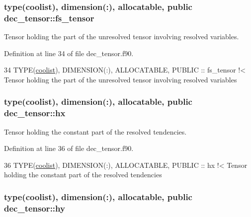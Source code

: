 \subsubsection[{\texorpdfstring{fs\+\_\+tensor}{fs_tensor}}]{\setlength{\rightskip}{0pt plus 5cm}type({\bf coolist}), dimension(\+:), allocatable, public dec\+\_\+tensor\+::fs\+\_\+tensor}\hypertarget{namespacedec__tensor_ac3f4574fab9acab6741a1660a49442b9}{}\label{namespacedec__tensor_ac3f4574fab9acab6741a1660a49442b9}


Tensor holding the part of the unresolved tensor involving resolved variables. 



Definition at line 34 of file dec\+\_\+tensor.\+f90.


\begin{DoxyCode}
34   \textcolor{keywordtype}{TYPE}(\hyperlink{structtensor_1_1coolist}{coolist}), \textcolor{keywordtype}{DIMENSION(:)}, \textcolor{keywordtype}{ALLOCATABLE}, \textcolor{keywordtype}{PUBLIC} :: fs\_tensor\textcolor{comment}{ !< Tensor holding the part of the
       unresolved tensor involving resolved variables}
\end{DoxyCode}
\subsubsection[{\texorpdfstring{hx}{hx}}]{\setlength{\rightskip}{0pt plus 5cm}type({\bf coolist}), dimension(\+:), allocatable, public dec\+\_\+tensor\+::hx}\hypertarget{namespacedec__tensor_ac7de63dc4f2ca5ef353c9ee4442e6f78}{}\label{namespacedec__tensor_ac7de63dc4f2ca5ef353c9ee4442e6f78}


Tensor holding the constant part of the resolved tendencies. 



Definition at line 36 of file dec\+\_\+tensor.\+f90.


\begin{DoxyCode}
36   \textcolor{keywordtype}{TYPE}(\hyperlink{structtensor_1_1coolist}{coolist}), \textcolor{keywordtype}{DIMENSION(:)}, \textcolor{keywordtype}{ALLOCATABLE}, \textcolor{keywordtype}{PUBLIC} :: hx\textcolor{comment}{ !< Tensor holding the constant part of the
       resolved tendencies}
\end{DoxyCode}
\subsubsection[{\texorpdfstring{hy}{hy}}]{\setlength{\rightskip}{0pt plus 5cm}type({\bf coolist}), dimension(\+:), allocatable, public dec\+\_\+tensor\+::hy}\hypertarget{namespacedec__tensor_a9c51afb9b52f76670bcb3496d32fabf3}{}\label{namespacedec__tensor_a9c51afb9b52f76670bcb3496d32fabf3}


